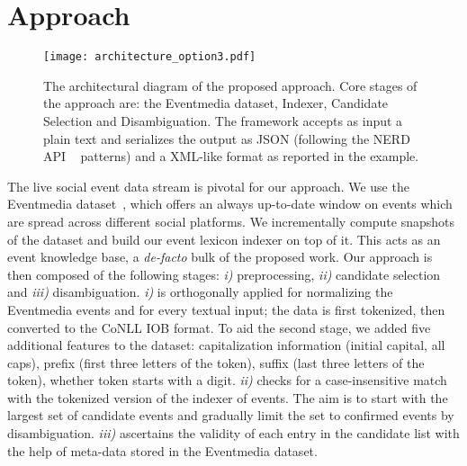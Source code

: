 \documentclass[10pt,a4paper]{article}
\begin{document}
\section{Approach}
\begin{figure}
\texttt{[image: architecture\_option3.pdf]}
\caption{The architectural diagram of the proposed approach. Core stages of the approach are: the Eventmedia dataset, Indexer, Candidate Selection and Disambiguation. The framework accepts as input a plain text and serializes the output as JSON (following the NERD API ~\cite{RIZZO:2012} patterns) and a XML-like format as reported in the example.}
\label{fig:architecture}
\end{figure}
The live social event data stream is pivotal for our approach. We use the Eventmedia dataset~\cite{krouf2012}, which offers an always up-to-date window on events which are spread across different social platforms. We incrementally compute snapshots of the dataset and build our event lexicon indexer on top of it. This acts as an event knowledge base, a \textit{de-facto} bulk of the proposed work. Our approach is then composed of the following stages: \textit{i)} preprocessing, \textit{ii)} candidate selection and \textit{iii)} disambiguation. \textit{i)} is orthogonally applied for normalizing the Eventmedia events and for every textual input; the data is first tokenized, then converted to the CoNLL IOB format. To aid the second stage, we added five additional features to the dataset: capitalization information (initial capital, all caps), prefix (first three letters of the token), suffix (last three letters of the token), whether token starts with a digit.
\textit{ii)} checks for a case-insensitive match with the tokenized version of the indexer of events. 
The aim is to start with the largest set of candidate events and gradually limit the set to confirmed events by disambiguation. 
\textit{iii)} ascertains the validity of each entry in the candidate list with the help of meta-data stored in the Eventmedia dataset. 
\end{document}

